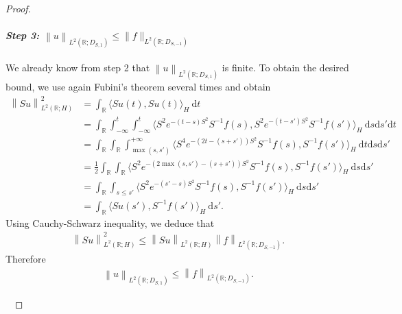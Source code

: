 \documentclass[11pt, letterpaper]{amsart}
\theoremstyle{definition}
\theoremstyle{remark}
\numberwithin{equation}{section}
\begin{document}
\begin{proof}
\

\paragraph{\textit{Step 3:  $\left\|u \right\|_{L^2(\mathbb{R}; D_{S,1})} \le  \|f\|_{L^2(\mathbb{R};D_{S,-1})}$}} We already know from step 2 that $\left\|u \right\|_{L^2(\mathbb{R}; D_{S,1})}$ is finite. To obtain the desired bound, we use again Fubini's theorem several times and obtain 
\begin{align*}
    \left\|Su \right\|_{L^2(\mathbb{R};H)}^2&
    =\int_{\mathbb{R}} \langle  Su(t) , Su(t) \rangle_H \ \mathrm{d} t 
    \\
    &
    = \int_{\mathbb{R}} \int_{-\infty}^{t}\int_{-\infty}^{t} \langle  S^2 e^{-(t-s)S^2}S^{-1}f(s) , S^2 e^{-(t-s')S^2}S^{-1}f(s')\rangle_H \ \mathrm{d} s  \mathrm{d} s'  \mathrm{d} t  \\ 
    &
    = \int_{\mathbb{R}} \int_{\mathbb{R}}\int_{\max(s,s')}^{+\infty} \langle  S^4 e^{-(2t-(s+s'))S^2}S^{-1}f(s) ,  S^{-1}f(s')\rangle_H \ \mathrm{d} t  \mathrm{d} s  \mathrm{d} s'\\
    & = \frac{1}{2} \int_{\mathbb{R}} \int_{\mathbb{R}} \langle  S^2 e^{-(2\max(s,s')-(s+s'))S^2}S^{-1}f(s) , S^{-1}f(s')\rangle_H  \ \mathrm{d} s  \mathrm{d} s'\\
    &=  \int_{\mathbb{R}} \int_{s\leq s'} \langle  S^2 e^{-(s'-s)S^2}S^{-1}f(s) , S^{-1}f(s')\rangle_H  \ \mathrm{d} s  \mathrm{d} s'\\
    &=  \int_{\mathbb{R}} \langle  Su(s') , S^{-1}f(s')\rangle_H \ \mathrm{d} s'.
\end{align*}
Using Cauchy-Schwarz inequality, we deduce that
\begin{align*}
     \left\|Su \right\|_{L^2(\mathbb{R};H)}^2 \leq  \left\|Su \right\|_{L^2(\mathbb{R};H)}  \left\|f \right\|_{L^2(\mathbb{R};D_{S,-1})}.
\end{align*}
Therefore 
\begin{align*}
     \left\|u \right\|_{L^2(\mathbb{R};D_{S,1})} \leq   \left\|f \right\|_{L^2(\mathbb{R};D_{S,-1})}.
\end{align*}

\


\end{proof}
\end{document}

